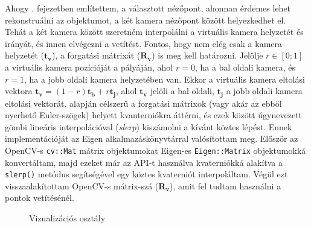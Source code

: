 Ahogy . fejezetben említettem, a választott nézőpont, ahonnan érdemes lehet rekonstruálni az objektumot, a két kamera nézőpont között helyezkedhet el. Tehát a két kamera között szeretném interpolálni a virtuális kamera helyzetét és irányát, és innen elvégezni a vetítést. Fontos, hogy nem elég csak a kamera helyzetét ($\mathbf{t_v}$), a forgatási mátrixát ($\mathbf{R_v}$) is meg kell határozni. Jelölje $r \in [0; 1]$ a virtuális kamera pozícióját a pályáján, ahol $r = 0$, ha a bal oldali kamera, és $r = 1$, ha a jobb oldali kamera helyzetében van. Ekkor a virtuális kamera eltolási vektora $\mathbf{t_v} = (1-r)\mathbf{t_b} + r\mathbf{t_j}$, ahol $\mathbf{t_v}$ jelöli a bal oldali, $\mathbf{t_j}$ a jobb oldali kamera eltolási vektorát. \cite{quaternion} alapján célszerű a forgatási mátrixok (vagy akár az ebből nyerhető Euler-szögek) helyett kvanterniókra áttérni, és ezek között úgynevezett gömbi lineáris interpolációval (\textit{slerp}) kiszámolni a kívánt köztes lépést. Ennek implementációját az Eigen \cite{eigenweb} alkalmazáskönyvtárral valósítottam meg. Először az OpenCV-s \texttt{cv::Mat} mátrix objektumokat Eigen-es \texttt{Eigen::Matrix} objektumokká konvertáltam, majd ezeket már az API-t használva kvaterniókká alakítva a \texttt{slerp()} metódus segítségével egy köztes kvaterniót interpoláltam. Végül ezt visszaalakítottam OpenCV-s mátrix-szá ($\mathbf{R_v}$), amit fel tudtam használni a pontok vetítésénél.

\begin{figure}[tbh]
\centering


\caption{Vizualizációs osztály \label{fig:cd:visualization}}
\end{figure}

